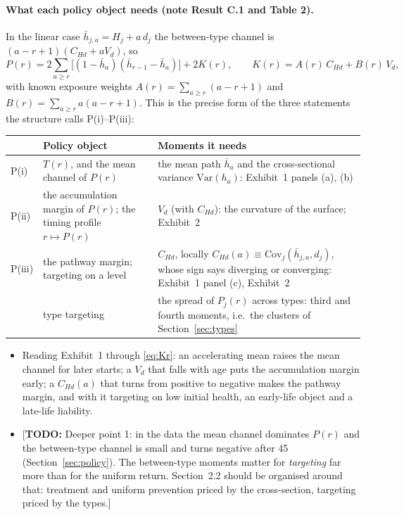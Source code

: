 \documentclass[11pt]{article}
\newcommand{\Var}{\mathrm{Var}}
\newcommand{\Cov}{\mathrm{Cov}}
\newcommand{\todo}[1]{\textcolor{red!75!black}{[\textbf{TODO:} #1]}}
\begin{document}
\paragraph{What each policy object needs (note Result C.1 and Table 2).} In the linear case $\bar h_{j,a}=H_j+a\,d_j$ the between-type channel is $(a-r+1)(C_{Hd}+aV_d)$, so
\begin{equation}
P(r)=2\sum_{a\ge r}\bigl[(1-\bar h_a)(\bar h_{r-1}-\bar h_a)\bigr]+2K(r),\qquad
K(r)=A(r)\,C_{Hd}+B(r)\,V_d,
\label{eq:Kr}
\end{equation}
with known exposure weights $A(r)=\sum_{a\ge r}(a-r+1)$ and $B(r)=\sum_{a\ge r}a(a-r+1)$. This is the precise form of the three statements the structure calls P(i)--P(iii):

\begin{center}\small
\begin{tabular}{@{}lp{5.6cm}p{5.6cm}@{}}
\toprule
 & Policy object & Moments it needs \\
\midrule
P(i) & $T(r)$, and the mean channel of $P(r)$ & the mean path $\bar h_a$ and the cross-sectional
variance $\Var(h_a)$: Exhibit~1 panels (a), (b) \\
P(ii) & the accumulation margin of $P(r)$; the timing profile $r\mapsto P(r)$ & $V_d$ (with
$C_{Hd}$): the curvature of the surface; Exhibit~2 \\
P(iii) & the pathway margin; targeting on a level & $C_{Hd}$, locally $C_{Hd}(a)\equiv
\Cov_j(\bar h_{j,a},d_j)$, whose sign says diverging or converging: Exhibit~1 panel (c),
Exhibit~2 \\
 & type targeting & the spread of $P_j(r)$ across types: third and fourth moments, i.e.\ the
clusters of Section~\ref{sec:types} \\
\bottomrule
\end{tabular}
\end{center}

\begin{itemize}
\item Reading Exhibit~1 through \eqref{eq:Kr}: an accelerating mean raises the mean channel for later starts; a $V_d$ that falls with age puts the accumulation margin early; a $C_{Hd}(a)$ that turns from positive to negative makes the pathway margin, and with it targeting on low initial health, an early-life object and a late-life liability.
\item \todo{Deeper point 1: in the data the mean channel dominates $P(r)$ and the between-type channel is small and turns negative after 45 (Section~\ref{sec:policy}). The between-type moments matter for \emph{targeting} far more than for the uniform return. Section~2.2 should be organised around that: treatment and uniform prevention priced by the cross-section, targeting priced by the types.}
\end{itemize}
\end{document}
